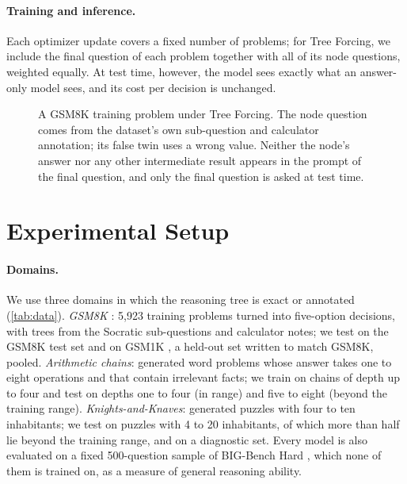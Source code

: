 \documentclass{article}
\newcommand{\tf}{Tree Forcing}
\begin{document}
\paragraph{Training and inference.} Each optimizer update covers a fixed number of problems; for \tf{}, we include
the final question of each problem together with all of its node questions, weighted equally. At test time, however,
the model sees exactly what an answer-only model sees, and its cost per decision is unchanged.

\begin{figure}[t]
\centering
\footnotesize
{}
\caption{A GSM8K training problem under \tf{}. The node question comes from the dataset's own sub-question and
calculator annotation; its false twin uses a wrong value. Neither the node's answer nor any other intermediate result
appears in the prompt of the final question, and only the final question is asked at test time.}
\label{fig:example}
\end{figure}

\section{Experimental Setup}
\label{sec:setup}

\paragraph{Domains.} We use three domains in which the reasoning tree is exact or annotated (\cref{tab:data}).
\emph{GSM8K} \citep{cobbe2021gsm8k}: 5,923 training problems turned into five-option decisions, with trees from the
Socratic sub-questions and calculator notes; we test on the GSM8K test set and on GSM1K \citep{zhang2024gsm1k}, a
held-out set written to match GSM8K, pooled. \emph{Arithmetic chains}: generated word problems whose answer takes one
to eight operations and that contain irrelevant facts; we train on chains of depth up to four and test on depths one
to four (in range) and five to eight (beyond the training range). \emph{Knights-and-Knaves}: generated puzzles
with four to ten inhabitants; we test on puzzles with 4 to 20 inhabitants, of which more than half lie beyond the
training range, and on a diagnostic set. Every model is also evaluated on a fixed 500-question sample of BIG-Bench Hard \citep{suzgun2022bbh},
which none of them is trained on, as a measure of general reasoning ability.
\end{document}
